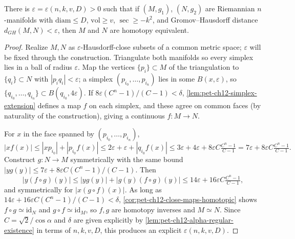\begin{lemma}
  \label{lem:pet-ch12-gh-close-homotopy-equivalent}
  There is $\varepsilon=\varepsilon(n,k,v,D)>0$ such that if $(M,g_1)$,
  $(N,g_2)$ are Riemannian $n$-manifolds with $\mathrm{diam}\le D$,
  $\mathrm{vol}\ge v$, $\sec\ge-k^2$, and Gromov--Hausdorff distance
  $d_{GH}(M,N)<\varepsilon$, then $M$ and $N$ are homotopy equivalent.
\end{lemma}
\begin{proof}
  Realize $M,N$ as $\varepsilon$-Hausdorff-close subsets of a common metric
  space; $\varepsilon$ will be fixed through the construction. Triangulate both
  manifolds so every simplex lies in a ball of radius $\varepsilon$. Map the
  vertices $\{p_i\}\subset M$ of the triangulation to $\{q_i\}\subset N$ with
  $|p_iq_i|<\varepsilon$; a simplex $(p_{i_0},\dots,p_{i_n})$ lies in some
  $B(x,\varepsilon)$, so $\{q_{i_0},\dots,q_{i_n}\}\subset B(q_{i_0},4\varepsilon)$.
  If $8\varepsilon(C^n-1)/(C-1)<\delta$, \cref{lem:pet-ch12-simplex-extension}
  defines a map $f$ on each simplex, and these agree on common faces (by
  naturality of the construction), giving a continuous $f:M\to N$.

  For $x$ in the face spanned by $(p_{i_0},\dots,p_{i_n})$,
  \[
    |xf(x)|\le|xp_{i_0}|+|p_{i_0}f(x)|\le2\varepsilon+\varepsilon+|q_{i_0}f(x)|
    \le3\varepsilon+4\varepsilon+8\varepsilon C\tfrac{C^n-1}{C-1}
    =7\varepsilon+8\varepsilon C\tfrac{C^n-1}{C-1}.
  \]
  Construct $g:N\to M$ symmetrically with the same bound
  $|yg(y)|\le7\varepsilon+8\varepsilon C(C^n-1)/(C-1)$. Then
  \[
    |y(f\circ g)(y)|\le|yg(y)|+|g(y)(f\circ g)(y)|\le14\varepsilon+16\varepsilon
    C\tfrac{C^n-1}{C-1},
  \]
  and symmetrically for $|x(g\circ f)(x)|$. As long as
  $14\varepsilon+16\varepsilon C(C^n-1)/(C-1)<\delta$,
  \cref{cor:pet-ch12-close-maps-homotopic} shows $f\circ g\simeq\mathrm{id}_N$
  and $g\circ f\simeq\mathrm{id}_M$, so $f,g$ are homotopy inverses and
  $M\simeq N$. Since $C=\sqrt2/\cos\alpha$ and $\delta$ are given explicitly by
  \cref{lem:pet-ch12-alpha-regular-existence} in terms of $n,k,v,D$, this
  produces an explicit $\varepsilon(n,k,v,D)$.
\end{proof}


